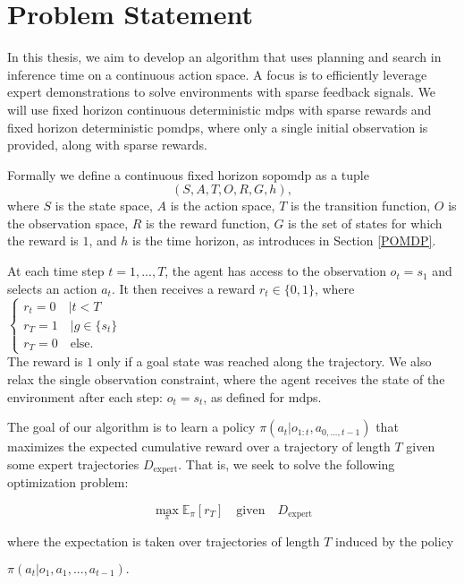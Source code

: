 \chapter{Problem Statement}
\label{chapter:Problem}
In this thesis, we aim to develop an algorithm that uses planning and search in inference time on a continuous action space. 
A focus is to efficiently leverage expert demonstrations to solve environments with sparse feedback signals. We will use fixed horizon continuous 
deterministic \ac{mdp}s with sparse rewards and fixed horizon deterministic \ac{pomdp}s, where only a single initial observation is provided, along with sparse rewards. 

Formally we define a continuous fixed horizon \ac{sopomdp} as a tuple
$$( S,A,T,O,R,G, h ),$$
where $S$ is the state space, $A$ is the action space, $T$ is the transition 
function, $O$ is the observation space, $R$ is the reward function, $G$ is the set of states for which the reward is $1$, and $h$ is the time horizon, as introduces in Section \ref{POMDP}.

At each time step $t=1,...,T$, the agent has access to the observation $o_t = s_1$ and selects an action $a_t$.  
It then receives a 
reward $r_t\in \{0,1\}$, where 
$\begin{cases}
    r_t = 0 \quad  |t < T\\
    r_T = 1 \quad  |g \in \{ s_t \}\\
    r_T = 0 \quad \text{else.}
\end{cases}$ \\
The reward is $1$ only if a goal state was reached along the trajectory. We also relax the single 
observation constraint, where the agent receives the state of the environment after each step: $o_t = s_t$, as defined for \ac{mdp}s.

The goal of our algorithm is to learn a policy $\pi(a_t|o_{1:t}, a_{0,...,t-1})$ that maximizes the expected cumulative reward over a trajectory of length $T$ given 
some expert trajectories $D_{\text{expert}}$. 
That is, we seek to solve the following optimization problem:

\begin{equation}
\max_{\pi} \mathbb{E}_{\pi}[r_T]\quad \text{given}\quad D_{\text{expert}}
\end{equation}

where the expectation is taken over trajectories of length $T$ induced by the policy 

$\pi(a_t|o_1, a_1, ..., a_{t-1}).$

